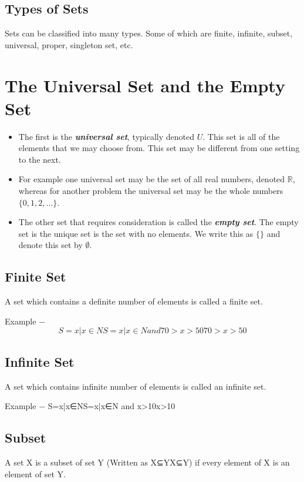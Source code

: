 
\subsection{Types of Sets}
Sets can be classified into many types. Some of which are finite, infinite, subset, universal, proper, singleton set, etc.
\section*{The Universal Set and the Empty Set}
\begin{itemize}
\item The first is the \textbf{\textit{universal set}}, typically denoted $U$. This set is all of the elements that we may choose from. This set may be different from one setting to the next. 

\item For example one universal set may be the set of all real numbers, denoted $\mathbb{R}$, whereas for another problem the universal set may be the whole numbers $\{0, 1, 2,\ldots\}$.

\item The other set that requires consideration is called the \textit{\textbf{empty set}}. The empty set is the unique set is the set with no elements. We write this as $\{ \}$ and denote this set by $\emptyset$.
\end{itemize}



\subsection{Finite Set}
A set which contains a definite number of elements is called a finite set.

Example − \[S={x|x∈NS={x|x∈N and 70>x>50}70>x>50}\]
\subsection{Infinite Set}
A set which contains infinite number of elements is called an infinite set.

Example − S={x|x∈NS={x|x∈N and x>10}x>10}
\subsection{Subset}
A set X is a subset of set Y (Written as X⊆YX⊆Y) if every element of X is an element of set Y.

